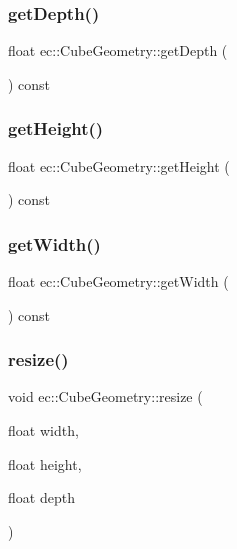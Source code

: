 \subsubsection{\texorpdfstring{get\+Depth()}{getDepth()}}
{\footnotesize\ttfamily float ec\+::\+Cube\+Geometry\+::get\+Depth (\begin{DoxyParamCaption}{ }\end{DoxyParamCaption}) const}

\mbox{\label{classec_1_1_cube_geometry_a43599cbf63a2c285a2b08c5eee7ad5b8}} 
\subsubsection{\texorpdfstring{get\+Height()}{getHeight()}}
{\footnotesize\ttfamily float ec\+::\+Cube\+Geometry\+::get\+Height (\begin{DoxyParamCaption}{ }\end{DoxyParamCaption}) const}

\mbox{\label{classec_1_1_cube_geometry_ab164f9799b3590dc2f8328480094ca38}} 
\subsubsection{\texorpdfstring{get\+Width()}{getWidth()}}
{\footnotesize\ttfamily float ec\+::\+Cube\+Geometry\+::get\+Width (\begin{DoxyParamCaption}{ }\end{DoxyParamCaption}) const}

\mbox{\label{classec_1_1_cube_geometry_a627e0b292fee9b9c746c4ac221d167b6}} 
\subsubsection{\texorpdfstring{resize()}{resize()}}
{\footnotesize\ttfamily void ec\+::\+Cube\+Geometry\+::resize (\begin{DoxyParamCaption}\item[{float}]{width,  }\item[{float}]{height,  }\item[{float}]{depth }\end{DoxyParamCaption})}



